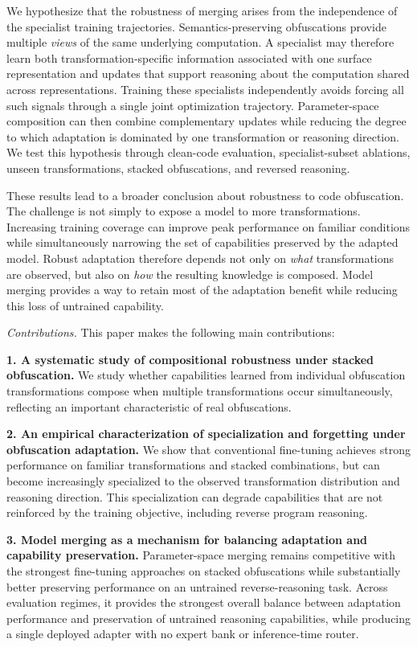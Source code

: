 We hypothesize that the robustness of merging arises from the independence of
the specialist training trajectories. Semantics-preserving obfuscations provide
multiple \emph{views} of the same underlying computation. A specialist may
therefore learn both transformation-specific information associated with one
surface representation and updates that support reasoning about the computation
shared across representations. Training these specialists independently avoids
forcing all such signals through a single joint optimization trajectory.
Parameter-space composition can then combine complementary updates while
reducing the degree to which adaptation is dominated by one transformation
or reasoning direction. We test this hypothesis through clean-code evaluation,
specialist-subset ablations, unseen transformations, stacked obfuscations, and
reversed reasoning.

These results lead to a broader conclusion about robustness to code
obfuscation. The challenge is not simply to expose a model to more
transformations. Increasing training coverage can improve peak performance on
familiar conditions while simultaneously narrowing the set of capabilities
preserved by the adapted model. Robust adaptation therefore depends not only
on \emph{what} transformations are observed, but also on \emph{how} the
resulting knowledge is composed. Model merging provides a way to retain most
of the adaptation benefit while reducing this loss of untrained capability.


{\em Contributions.}
This paper makes the following main contributions:

\textbf{1. A systematic study of compositional robustness under stacked
obfuscation.}
We study whether capabilities learned from individual obfuscation
transformations compose when multiple transformations occur simultaneously,
reflecting an important characteristic of real obfuscations.

\textbf{2. An empirical characterization of specialization and forgetting
under obfuscation adaptation.}
We show that conventional fine-tuning achieves strong performance on familiar
transformations and stacked combinations, but can become increasingly
specialized to the observed transformation distribution and reasoning
direction. This specialization can degrade capabilities that are not reinforced
by the training objective, including reverse program reasoning.

\textbf{3. Model merging as a mechanism for balancing adaptation and
capability preservation.}
Parameter-space merging remains competitive with the strongest fine-tuning
approaches on stacked obfuscations while substantially better preserving
performance on an untrained reverse-reasoning task. Across evaluation regimes,
it provides the strongest overall balance between adaptation performance and
preservation of untrained reasoning capabilities, while producing a single
deployed adapter with no expert bank or inference-time router.

